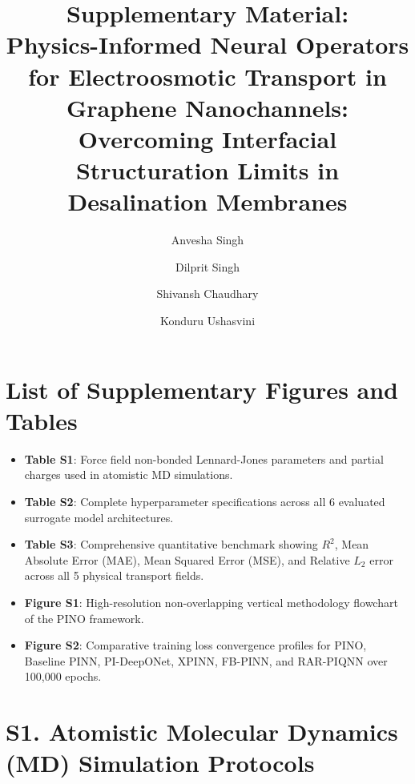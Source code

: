 \documentclass[3p,preprint,12pt,numbers,square,sort&compress]{elsarticle}
\begin{document}
\begin{frontmatter}

\title{\textbf{Supplementary Material:}\\Physics-Informed Neural Operators for Electroosmotic Transport in Graphene Nanochannels: Overcoming Interfacial Structuration Limits in Desalination Membranes}

\author[inst1]{Anvesha Singh}
\author[inst1]{Dilprit Singh}
\author[inst1]{Shivansh Chaudhary}
\author[inst1]{Konduru Ushasvini}


\end{frontmatter}

\newpage
\tableofcontents
\newpage

\section*{List of Supplementary Figures and Tables}
\begin{itemize}
    \item \textbf{Table S1}: Force field non-bonded Lennard-Jones parameters and partial charges used in atomistic MD simulations.
    \item \textbf{Table S2}: Complete hyperparameter specifications across all 6 evaluated surrogate model architectures.
    \item \textbf{Table S3}: Comprehensive quantitative benchmark showing $R^2$, Mean Absolute Error (MAE), Mean Squared Error (MSE), and Relative $L_2$ error across all 5 physical transport fields.
    \item \textbf{Figure S1}: High-resolution non-overlapping vertical methodology flowchart of the PINO framework.
    \item \textbf{Figure S2}: Comparative training loss convergence profiles for PINO, Baseline PINN, PI-DeepONet, XPINN, FB-PINN, and RAR-PIQNN over 100,000 epochs.
\end{itemize}

\newpage

\section{S1. Atomistic Molecular Dynamics (MD) Simulation Protocols}
\end{document}
